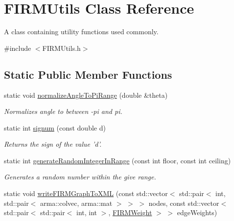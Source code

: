 \hypertarget{class_f_i_r_m_utils}{\section{F\-I\-R\-M\-Utils Class Reference}
\label{class_f_i_r_m_utils}
}


A class containing utility functions used commonly.  




{\ttfamily \#include $<$F\-I\-R\-M\-Utils.\-h$>$}

\subsection*{Static Public Member Functions}
\begin{DoxyCompactItemize}
\item 
\hypertarget{class_f_i_r_m_utils_acfd3f8727df2dbf670a698ee28c7c7e6}{static void \hyperlink{class_f_i_r_m_utils_acfd3f8727df2dbf670a698ee28c7c7e6}{normalize\-Angle\-To\-Pi\-Range} (double \&theta)}\label{class_f_i_r_m_utils_acfd3f8727df2dbf670a698ee28c7c7e6}

\begin{DoxyCompactList}\small\item\em Normalizes angle to between -\/pi and pi. \end{DoxyCompactList}\item 
\hypertarget{class_f_i_r_m_utils_a5420e20b6bb30264c4d2dfe6af55743e}{static int \hyperlink{class_f_i_r_m_utils_a5420e20b6bb30264c4d2dfe6af55743e}{signum} (const double d)}\label{class_f_i_r_m_utils_a5420e20b6bb30264c4d2dfe6af55743e}

\begin{DoxyCompactList}\small\item\em Returns the sign of the value 'd'. \end{DoxyCompactList}\item 
\hypertarget{class_f_i_r_m_utils_ab608b5452db980635b7e07e88b1c017a}{static int \hyperlink{class_f_i_r_m_utils_ab608b5452db980635b7e07e88b1c017a}{generate\-Random\-Integer\-In\-Range} (const int floor, const int ceiling)}\label{class_f_i_r_m_utils_ab608b5452db980635b7e07e88b1c017a}

\begin{DoxyCompactList}\small\item\em Generates a random number within the give range. \end{DoxyCompactList}\item 
\hypertarget{class_f_i_r_m_utils_af7e9eef5fb536ba18c9b1f8ce81c8964}{static void \hyperlink{class_f_i_r_m_utils_af7e9eef5fb536ba18c9b1f8ce81c8964}{write\-F\-I\-R\-M\-Graph\-To\-X\-M\-L} (const std\-::vector$<$ std\-::pair$<$ int, std\-::pair$<$ arma\-::colvec, arma\-::mat $>$ $>$ $>$ nodes, const std\-::vector$<$ std\-::pair$<$ std\-::pair$<$ int, int $>$, \hyperlink{class_f_i_r_m_weight}{F\-I\-R\-M\-Weight} $>$ $>$ edge\-Weights)}\label{class_f_i_r_m_utils_af7e9eef5fb536ba18c9b1f8ce81c8964}


\end{DoxyCompactItemize}
